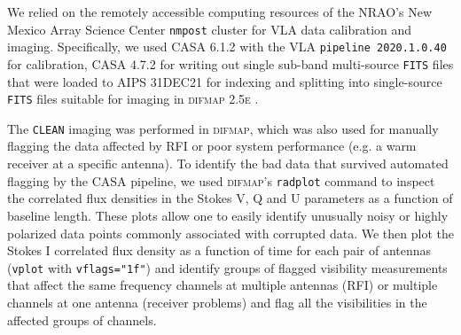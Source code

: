 \documentclass[a4paper,fleqn,usenatbib]{mnras}
\begin{document}

We relied on the remotely accessible computing resources of the NRAO's New Mexico Array Science Center \texttt{nmpost} cluster
for VLA data calibration and imaging. Specifically, we used \textsc{CASA 6.1.2} \citep{2007ASPC..376..127M} 
with the VLA \texttt{pipeline 2020.1.0.40} %
for calibration, 
\textsc{CASA 4.7.2} for writing out single sub-band multi-source \texttt{FITS} files that were loaded to 
\textsc{AIPS 31DEC21} \citep{2003ASSL..285..109G} for indexing and splitting into single-source \texttt{FITS} 
files suitable for imaging in \textsc{difmap 2.5e} \citep{1994BAAS...26..987S,1997ASPC..125...77S}.

The \texttt{CLEAN} \citep{1974A&AS...15..417H} imaging
was performed in \textsc{difmap}, 
which was also used for manually flagging the data affected by RFI or poor
system performance 
(e.g. a warm receiver at a specific antenna). 
%
To identify the bad data that survived automated flagging by the \textsc{CASA} 
pipeline, we used \textsc{difmap}'s \texttt{radplot} command to inspect 
the correlated flux densities in the Stokes V, Q and U parameters as a function of
baseline length. These plots allow one to easily identify unusually noisy or highly 
polarized data points commonly associated with corrupted data. We then plot
the Stokes I correlated flux density as a function of time for each pair of
antennas (\texttt{vplot} with \texttt{vflags="1f"}) and identify groups of
flagged visibility measurements that affect the same frequency channels at
multiple antennas (RFI) or multiple channels at one antenna (receiver
problems) and flag all the visibilities in the affected groups of channels.
\end{document}
